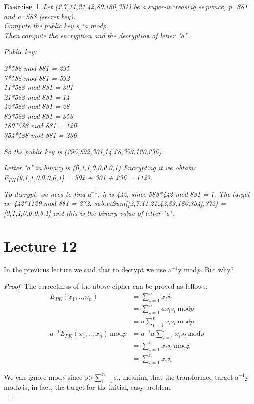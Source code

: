 \documentclass[a4paper, 12pt]{report}
\newtheorem{exercise}{\textbf{Exercise}}
\begin{document}
\begin{exercise}
	Let (2,7,11,21,42,89,180,354) be a super-increasing sequence, p=881 and a=588 (secret key).\\
	Compute the public key s$_i$*a mod\textit{p}.\\
	Then compute the encryption and the decryption of letter "a".
	
	Public key:
	\begin{center}
		2*588 mod 881 = 295\\
		7*588 mod 881 = 592\\
		11*588 mod 881 = 301\\
		21*588 mod 881 = 14\\
		42*588 mod 881 = 28\\
		89*588 mod 881 = 353\\
		180*588 mod 881 = 120\\
		354*588 mod 881 = 236\\
	\end{center}
	So the public key is (295,592,301,14,28,353,120,236).
	
	Letter "a" in binary is (0,1,1,0,0,0,0,1)
	Encrypting it we obtain:\\
	E$_{PK}$(0,1,1,0,0,0,0,1) = 592 + 301 + 236 = 1129.
	
	To decrypt, we need to find a$^{-1}$, it is 442, since 588*442 mod 881 = 1.
	The target is: 442*1129 mod 881 = 372.
	subsetSum([2,7,11,21,42,89,180,354],372) = [0,1,1,0,0,0,0,1] and this is the binary value of letter "a". 
\end{exercise}

\chapter*{Lecture 12}
In the previous lecture we said that to decrypt we use a$^{-1}$y mod\textit{p}. But why?

\begin{proof}
	The correctness of the above cipher can be proved as follows:
	\setcounter{equation}{0}
	\begin{align}
		E_{PK}(x_1,..,x_n) &= \sum_{i=1}^{n}x_i\hat{s}_i\\
		&= \sum_{i=1}^{n} ax_is_i \ \text{mod}p\\
		&= a\sum_{i=1}^{n} x_is_i \ \text{mod}p\\
		a^{-1}E_{PK}(x_1,..,x_n) \ \text{mod}p &= a^{-1}a\sum_{i=1}^{n} x_is_i \ \text{mod}p\\
		&= \sum_{i=1}^{n} x_is_i \ \text{mod}p\\
		&= \sum_{i=1}^{n} x_is_i
	\end{align}
	
	We can ignore mod\textit{p} since p>$\sum_{i=1}^{n}$s$_i$, meaning that the transformed target a$^{-1}$y mod\textit{p} is, in fact, the target for the initial, easy problem.\\
\end{proof}
\end{document}
